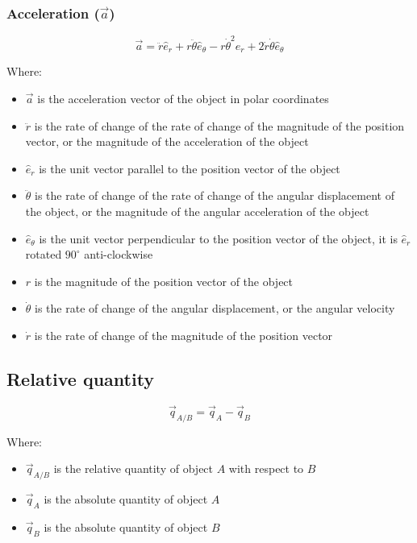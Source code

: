 \documentclass[11pt]{article}
\begin{document}
 \newpage

\subsubsection{Acceleration (\(\vec{a}\))}
\label{sec:org4e253c8}
\label{org0882e58}
\[\vec{a} = \ddot{r} \hat{e}_r + r \ddot{\theta} \hat{e}_{\theta} - r \dot{\theta}^2 \hat{e}_r + 2 \dot{r} \dot{\theta} \hat{e}_{\theta}\]

Where:
\begin{itemize}
\item \(\vec{a}\) is the acceleration vector of the object in polar coordinates
\item \(\ddot{r}\) is the rate of change of the rate of change of the magnitude of the position vector, or the magnitude of the acceleration of the object
\item \(\hat{e}_r\) is the unit vector parallel to the position vector of the object
\item \(\ddot{\theta}\) is the rate of change of the rate of change of the angular displacement of the object, or the magnitude of the angular acceleration of the object
\item \(\hat{e}_{\theta}\) is the unit vector perpendicular to the position vector of the object, it is \(\hat{e}_r\) rotated \(90^{\circ}\) anti-clockwise
\item \(r\) is the magnitude of the position vector of the object
\item \(\dot{\theta}\) is the rate of change of the angular displacement, or the angular velocity
\item \(\dot{r}\) is the rate of change of the magnitude of the position vector
\end{itemize}

\subsection{Relative quantity}
\label{sec:orgb4b963d}
\[\vec{q}_{A/B} = \vec{q}_A - \vec{q}_B\]

Where:
\begin{itemize}
\item \(\vec{q}_{A/B}\) is the relative quantity of object \(A\) with respect to \(B\)
\item \(\vec{q}_A\) is the absolute quantity of object \(A\)
\item \(\vec{q}_B\) is the absolute quantity of object \(B\)
\end{itemize}
\end{document}
